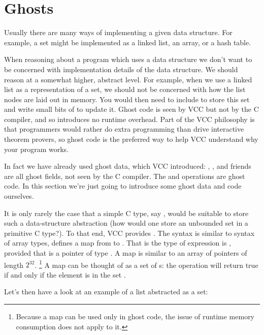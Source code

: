 \section{Ghosts}
\label{sect:ghosts}
Usually there are many ways of implementing a given data structure.
For example, a set might be implemented as a linked list, an array, or a hash table.

When reasoning about a program which uses a data structure we don't want to be
concerned with implementation details of the data structure.
We should reason at a somewhat higher, abstract level.
For example, when we use a linked list as a representation of a set, we should not be concerned
with how the list nodes are laid out in memory.
You would then need to include  to store this set and write small bits of  to
update it.  
Ghost code is seen by VCC but not by the C compiler, and
so introduces no runtime overhead. Part of the VCC philosophy is that
programmers would rather do extra programming than drive interactive
theorem provers, so ghost code is the preferred way to help VCC
understand why your program works.  

In fact we have already used ghost data, which VCC introduced: \vcc{\consistent},
\vcc{\owner}, and friends are all ghost fields, not seen by the C compiler.
The  and  operations are ghost code.
In this section we're just going to introduce some ghost data and code ourselves.

It is only rarely the case that a simple C type, say , would be suitable
to store such a data-structure abstraction (how would one store an unbounded set in a primitive C type?).
To that end, VCC provides .
The syntax is similar to syntax of array types,  defines a map  from 
to .
That is the type of expression  is , provided that  is a pointer
of type .
A map  is similar to an array of pointers of length $2^{32}$.%
\footnote{
  Because a map can be used only in ghost code, 
  the issue of runtime memory consumption does not apply to it.}
A map  can be thought of as a set of s: the operation
 will return true if and only if the element  is in the set .

Let's then have a look at an example of a list abstracted as a set:

